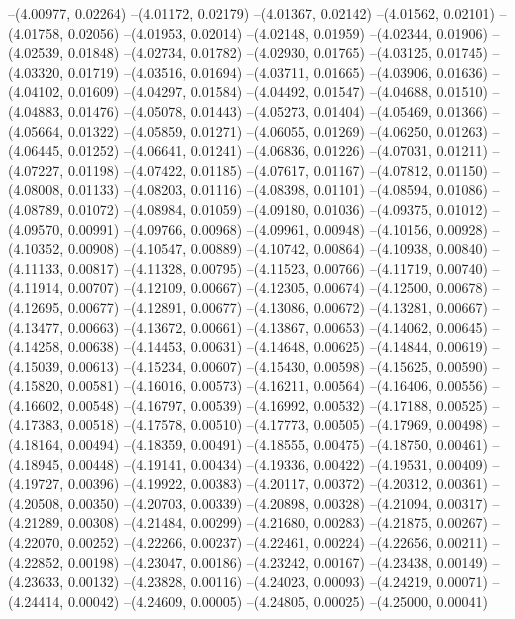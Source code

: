 --(4.00977, 0.02264)
--(4.01172, 0.02179)
--(4.01367, 0.02142)
--(4.01562, 0.02101)
--(4.01758, 0.02056)
--(4.01953, 0.02014)
--(4.02148, 0.01959)
--(4.02344, 0.01906)
--(4.02539, 0.01848)
--(4.02734, 0.01782)
--(4.02930, 0.01765)
--(4.03125, 0.01745)
--(4.03320, 0.01719)
--(4.03516, 0.01694)
--(4.03711, 0.01665)
--(4.03906, 0.01636)
--(4.04102, 0.01609)
--(4.04297, 0.01584)
--(4.04492, 0.01547)
--(4.04688, 0.01510)
--(4.04883, 0.01476)
--(4.05078, 0.01443)
--(4.05273, 0.01404)
--(4.05469, 0.01366)
--(4.05664, 0.01322)
--(4.05859, 0.01271)
--(4.06055, 0.01269)
--(4.06250, 0.01263)
--(4.06445, 0.01252)
--(4.06641, 0.01241)
--(4.06836, 0.01226)
--(4.07031, 0.01211)
--(4.07227, 0.01198)
--(4.07422, 0.01185)
--(4.07617, 0.01167)
--(4.07812, 0.01150)
--(4.08008, 0.01133)
--(4.08203, 0.01116)
--(4.08398, 0.01101)
--(4.08594, 0.01086)
--(4.08789, 0.01072)
--(4.08984, 0.01059)
--(4.09180, 0.01036)
--(4.09375, 0.01012)
--(4.09570, 0.00991)
--(4.09766, 0.00968)
--(4.09961, 0.00948)
--(4.10156, 0.00928)
--(4.10352, 0.00908)
--(4.10547, 0.00889)
--(4.10742, 0.00864)
--(4.10938, 0.00840)
--(4.11133, 0.00817)
--(4.11328, 0.00795)
--(4.11523, 0.00766)
--(4.11719, 0.00740)
--(4.11914, 0.00707)
--(4.12109, 0.00667)
--(4.12305, 0.00674)
--(4.12500, 0.00678)
--(4.12695, 0.00677)
--(4.12891, 0.00677)
--(4.13086, 0.00672)
--(4.13281, 0.00667)
--(4.13477, 0.00663)
--(4.13672, 0.00661)
--(4.13867, 0.00653)
--(4.14062, 0.00645)
--(4.14258, 0.00638)
--(4.14453, 0.00631)
--(4.14648, 0.00625)
--(4.14844, 0.00619)
--(4.15039, 0.00613)
--(4.15234, 0.00607)
--(4.15430, 0.00598)
--(4.15625, 0.00590)
--(4.15820, 0.00581)
--(4.16016, 0.00573)
--(4.16211, 0.00564)
--(4.16406, 0.00556)
--(4.16602, 0.00548)
--(4.16797, 0.00539)
--(4.16992, 0.00532)
--(4.17188, 0.00525)
--(4.17383, 0.00518)
--(4.17578, 0.00510)
--(4.17773, 0.00505)
--(4.17969, 0.00498)
--(4.18164, 0.00494)
--(4.18359, 0.00491)
--(4.18555, 0.00475)
--(4.18750, 0.00461)
--(4.18945, 0.00448)
--(4.19141, 0.00434)
--(4.19336, 0.00422)
--(4.19531, 0.00409)
--(4.19727, 0.00396)
--(4.19922, 0.00383)
--(4.20117, 0.00372)
--(4.20312, 0.00361)
--(4.20508, 0.00350)
--(4.20703, 0.00339)
--(4.20898, 0.00328)
--(4.21094, 0.00317)
--(4.21289, 0.00308)
--(4.21484, 0.00299)
--(4.21680, 0.00283)
--(4.21875, 0.00267)
--(4.22070, 0.00252)
--(4.22266, 0.00237)
--(4.22461, 0.00224)
--(4.22656, 0.00211)
--(4.22852, 0.00198)
--(4.23047, 0.00186)
--(4.23242, 0.00167)
--(4.23438, 0.00149)
--(4.23633, 0.00132)
--(4.23828, 0.00116)
--(4.24023, 0.00093)
--(4.24219, 0.00071)
--(4.24414, 0.00042)
--(4.24609, 0.00005)
--(4.24805, 0.00025)
--(4.25000, 0.00041)
